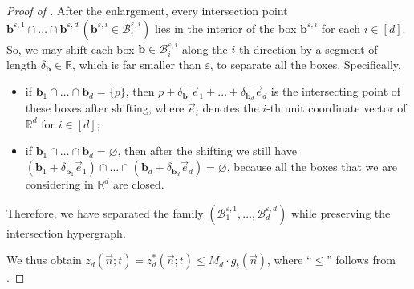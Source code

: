 \documentclass[10pt,a4paper]{amsart}
\newcommand*{\R}{\mathbb{R}}                                    %
\newcommand*{\cB}{\mathcal{B}}
\newcommand*{\veps}{\varepsilon}                                %
\newcommand*{\vn}{\vec{n}}
\begin{document}
\begin{proof}[Proof of ]
    After the enlargement, every intersection point $\bm{b}^{\veps, 1} \cap \dots \cap \bm{b}^{\veps, d} \, (\bm{b}^{\veps, i} \in \cB_i^{\veps, i})$ lies in the interior of the box $\bm{b}^{\veps, i}$ for each $i \in [d]$. So, we may shift each box $\bm{b} \in \cB_i^{\veps, i}$ along the $i$-th direction by a segment of length $\delta_{\bm{b}} \in \mathbb{R}$, which is far smaller than $\veps$, to separate all the boxes. Specifically, 
    \vspace{-0.5em}
    \begin{itemize}
        \item if $\bm{b}_1 \cap \dots \cap \bm{b}_d = \{p\}$, then $p + \delta_{\bm{b}_1} \vec{e}_1 + \dots + \delta_{\bm{b}_d} \vec{e}_d$ is the intersecting point of these boxes after shifting, where $\vec{e}_i$ denotes the $i$-th unit coordinate vector of $\R^d$ for $i \in [d]$; 
        \vspace{-0.5em}
        \item if $\bm{b}_1 \cap \dots \cap \bm{b}_d = \varnothing$, then after the shifting we still have $(\bm{b}_1 + \delta_{\bm{b}_1} \vec{e}_1) \cap \dots \cap (\bm{b}_d + \delta_{\bm{b}_d} \vec{e}_d) = \varnothing$, because all the boxes that we are considering in $\R^d$ are closed. 
    \end{itemize}
    \vspace{-0.5em}
    Therefore, we have separated the family $(\cB_1^{\veps,1}, \dots, \cB_d^{\veps,d})$ while preserving the intersection hypergraph. 

    We thus obtain $z_d(\vn; t) = z_d^*(\vn; t) \le M_d \cdot g_t(\vn)$, where ``$\le$'' follows from . 
\end{proof}
\end{document}
